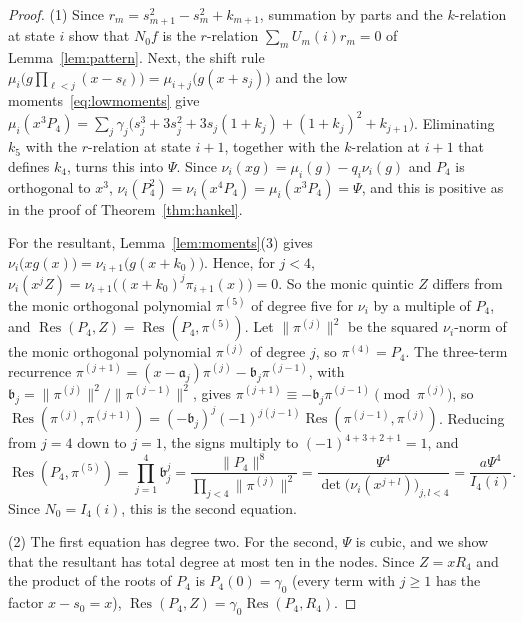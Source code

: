 \documentclass[11pt]{article}
\theoremstyle{definition}
\theoremstyle{remark}
\begin{document}
\begin{proof}
(1) Since $r_m=s_{m+1}^2-s_m^2+k_{m+1}$, summation by parts and the
$k$-relation at state $i$ show that $N_0f$ is the $r$-relation
$\sum_mU_m(i)r_m=0$ of Lemma~\ref{lem:pattern}. Next, the shift rule
$\mu_i\bigl(g\prod_{\ell<j}(x-s_\ell)\bigr)=\mu_{i+j}\bigl(g(x+s_j)\bigr)$ and
the low moments~\eqref{eq:lowmoments} give
$\mu_i(x^3P_4)=\sum_j\gamma_j\bigl(s_j^3+3s_j^2+3s_j(1+k_j)+(1+k_j)^2+k_{j+1}\bigr)$.
Eliminating $k_5$ with the $r$-relation at state $i+1$, together with the
$k$-relation at $i+1$ that defines $k_4$, turns this into $\Psi$.
Since $\nu_i(xg)=\mu_i(g)-q_i\nu_i(g)$ and $P_4$ is orthogonal to $x^3$,
$\nu_i(P_4^2)=\nu_i(x^4P_4)=\mu_i(x^3P_4)=\Psi$, and this is positive as in
the proof of Theorem~\ref{thm:hankel}.

For the resultant, Lemma~\ref{lem:moments}(3) gives
$\nu_i\bigl(xg(x)\bigr)=\nu_{i+1}\bigl(g(x+k_0)\bigr)$. Hence, for $j<4$,
$\nu_i(x^jZ)=\nu_{i+1}\bigl((x+k_0)^j\pi_{i+1}(x)\bigr)=0$. So the monic
quintic $Z$ differs from the monic orthogonal polynomial $\pi^{(5)}$ of degree
five for $\nu_i$ by a multiple of $P_4$, and $\operatorname{Res}(P_4,Z)=
\operatorname{Res}(P_4,\pi^{(5)})$. Let $\|\pi^{(j)}\|^2$ be the squared $\nu_i$-norm of
the monic orthogonal polynomial $\pi^{(j)}$ of degree $j$, so $\pi^{(4)}=P_4$. The
three-term recurrence
$\pi^{(j+1)}=(x-\mathfrak a_j)\pi^{(j)}-\mathfrak b_j\pi^{(j-1)}$, with
$\mathfrak b_j=\|\pi^{(j)}\|^2/\|\pi^{(j-1)}\|^2$, gives
$\pi^{(j+1)}\equiv-\mathfrak b_j\pi^{(j-1)}\pmod{\pi^{(j)}}$, so
$\operatorname{Res}(\pi^{(j)},\pi^{(j+1)})
=(-\mathfrak b_j)^j(-1)^{j(j-1)}\operatorname{Res}(\pi^{(j-1)},\pi^{(j)})$.
Reducing from $j=4$ down to $j=1$, the signs multiply to $(-1)^{4+3+2+1}=1$, and
\[
 \operatorname{Res}(P_4,\pi^{(5)})=\prod_{j=1}^4\mathfrak b_j^j
 =\frac{\|P_4\|^8}{\prod_{j<4}\|\pi^{(j)}\|^2}
 =\frac{\Psi^4}{\det\bigl(\nu_i(x^{j+l})\bigr)_{j,l<4}}
 =\frac{a\Psi^4}{I_4(i)}.
\]
Since $N_0=I_4(i)$, this is the second equation.

(2) The first equation has degree two. For the second, $\Psi$ is cubic, and we
show that the resultant has total degree at most ten in the nodes. Since
$Z=xR_4$ and the product of the roots of $P_4$ is $P_4(0)=\gamma_0$ (every term
with $j\ge1$ has the factor $x-s_0=x$),
$\operatorname{Res}(P_4,Z)=\gamma_0\operatorname{Res}(P_4,R_4)$.


\end{proof}
\end{document}
